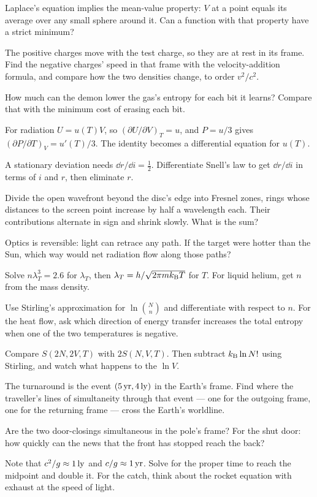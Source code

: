
 Laplace's equation implies the mean-value property: $V$ at a point equals its average over any small sphere around it. Can a function with that property have a strict minimum?

 The positive charges move with the test charge, so they are at rest in its frame. Find the negative charges' speed in that frame with the velocity-addition formula, and compare how the two densities change, to order $v^2/c^2$.


 How much can the demon lower the gas's entropy for each bit it learns? Compare that with the minimum cost of erasing each bit.

 For radiation $U = u(T)V$, so $(\partial U/\partial V)_T = u$, and $P = u/3$ gives $(\partial P/\partial T)_V = u'(T)/3$. The identity becomes a differential equation for $u(T)$.


 A stationary deviation needs $\dd r/\dd i = \tfrac12$. Differentiate Snell's law to get $\dd r/\dd i$ in terms of $i$ and $r$, then eliminate $r$.

 Divide the open wavefront beyond the disc's edge into Fresnel zones, rings whose distances to the screen point increase by half a wavelength each. Their contributions alternate in sign and shrink slowly. What is the sum?

 Optics is reversible: light can retrace any path. If the target were hotter than the Sun, which way would net radiation flow along those paths?


 Solve $n\lambda_T^3 = 2.6$ for $\lambda_T$, then $\lambda_T = h/\sqrt{2\pi mk_{\mathrm{B}} T}$ for $T$. For liquid helium, get $n$ from the mass density.

 Use Stirling's approximation for $\ln\binom Nn$ and differentiate with respect to $n$. For the heat flow, ask which direction of energy transfer increases the total entropy when one of the two temperatures is negative.

 Compare $S(2N,2V,T)$ with $2S(N,V,T)$. Then subtract $k_{\mathrm{B}}\ln N!$ using Stirling, and watch what happens to the $\ln V$.


 The turnaround is the event $(5\,\mathrm{yr}, 4\,\mathrm{ly})$ in the Earth's frame. Find where the traveller's lines of simultaneity through that event --- one for the outgoing frame, one for the returning frame --- cross the Earth's worldline.

 Are the two door-closings simultaneous in the pole's frame? For the shut door: how quickly can the news that the front has stopped reach the back?

 Note that $c^2/g\approx1\,\mathrm{ly}$ and $c/g\approx1\,\mathrm{yr}$. Solve for the proper time to reach the midpoint and double it. For the catch, think about the rocket equation with exhaust at the speed of light.

